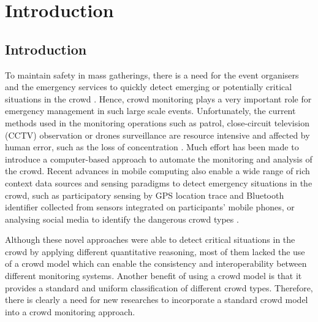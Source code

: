 \chapter{Introduction}  %
\label{ch:intro}
\ifpdf
    \graphicspath{{Chapter1/Figs/Raster/}{Chapter1/Figs/PDF/}{Chapter1/Figs/}}
\else
    \graphicspath{{Chapter1/Figs/Vector/}{Chapter1/Figs/}}
\fi

\section{Introduction}

To maintain safety in mass gatherings, there is a need for the event organisers and the emergency services to quickly detect emerging or potentially critical situations in the crowd \parencite{Wirz2012} . Hence, crowd monitoring plays a very important role for emergency management in such large scale events. Unfortunately, the current methods used in the monitoring operations such as patrol, close-circuit television (CCTV) observation or drones surveillance are resource intensive and affected by human error, such as the loss of concentration \parencite{Davies1995}. Much effort has been made to introduce a computer-based approach to automate the monitoring and analysis of the crowd. Recent advances in mobile computing also enable a wide range of rich context data sources and sensing paradigms to detect emergency situations in the crowd, such as participatory sensing by GPS location trace \parencite{Wirz2012} and Bluetooth identifier \parencite{Weppner2013} collected from sensors integrated on participants' mobile phones, or analysing social media to identify the dangerous crowd types \parencite{DelirHaghighi2013}.

Although these novel approaches were able to detect critical situations in the crowd by applying different quantitative reasoning, most of them lacked the use of a crowd model which can enable the consistency and interoperability between different monitoring systems. Another benefit of using a crowd model is that it provides a standard and uniform classification of different crowd types. Therefore, there is clearly a need for new researches to incorporate a standard crowd model into a crowd monitoring approach.


